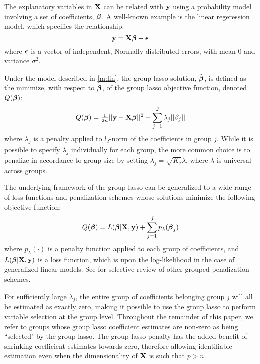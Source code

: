 The explanatory variables in $\mathbf{X}$ can be related with $\mathbf{y}$ using a probability model involving a set of coefficients, $\boldsymbol{\beta}$.  A well-known example is the linear regeression model, which specifies the relationship:
\begin{equation}
\label{m:lin}
\mathbf{y} = \mathbf{X}\boldsymbol{\beta} + \boldsymbol{\epsilon}
\end{equation}
where $\boldsymbol{\epsilon}$ is a vector of independent, Normally distributed errors, with mean 0 and variance $\sigma^2$. 

Under the model described in \ref{m:lin}, the group lasso solution, $\hat{\boldsymbol{\beta}}$, is defined as the minimize, with respect to $\boldsymbol{\beta}$, of the group lasso objective function, denoted $Q(\boldsymbol{\beta})$:
\begin{equation}
Q(\boldsymbol{\beta}) = \tfrac{1}{2n}||\mathbf{y} - \mathbf{X}\boldsymbol{\beta}||^2 + \sum_{j = 1}^{J}\lambda_j ||\beta_j||
\end{equation}
where $\lambda_j$ is a penalty applied to $l_2$-norm of the coefficients in group $j$.  While it is possible to specify $\lambda_j$ individually for each group, the more common choice is to penalize in accordance to group size by setting $\lambda_j = \sqrt{K_j}\lambda$, where $\lambda$ is universal across groups. 

The underlying framework of the group lasso can be generalized to a wide range of loss functions and penalization schemes whose solutions minimize the following objective function:
\begin{equation}
Q(\boldsymbol{\beta}) = L(\boldsymbol{\beta}|\mathbf{X},\mathbf{y}) + \sum_{j = 1}^{J} p_{\lambda}(\boldsymbol{\beta}_j)
\end{equation}
where $p_{\lambda}(\cdot)$ is a penalty function applied to each group of coefficients, and $L(\boldsymbol{\beta}|\mathbf{X},\mathbf{y})$ is a loss function, which is upon the log-likelihood in the case of generalized linear models.  See \citet{Huang2012} for selective review of other grouped penalization schemes.

For sufficiently large $\lambda_j$, the entire group of coefficients belonging group $j$ will all be estimated as exactly zero, making it possible to use the group lasso to perform variable selection at the group level.  Throughout the remainder of this paper, we refer to groups whose group lasso coefficient estimates are non-zero as being ``selected" by the group lasso.  The group lasso penalty has the added benefit of shrinking coefficient estimates towards zero, therefore allowing identifiable estimation even when the dimensionality of $\mathbf{X}$ is such that $p > n$.

